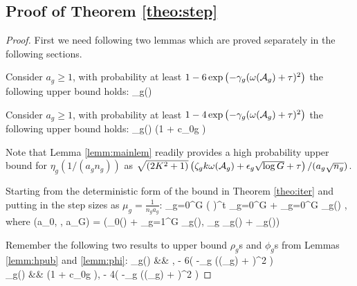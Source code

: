 \subsection{Proof of Theorem \ref{theo:step}}
\begin{proof}
	First we need following two lemmas which are proved separately in the following sections. 
	
	\begin{lemma}
		\label{lemm:hpub}
		Consider $a_g \geq 1$, with probability at least $1 - 6\exp\left( -\gamma_g (\omega({\cal A}_g) + \tau)^2  \right)$ the following upper bound holds:
		\be 
		\rho_g\left(\right) \leq {}  
		\ee
	\end{lemma}
	
	
	
	\begin{lemma}
		\label{lemm:phi}
		Consider $a_g \geq 1$, with probability at least $1 - 4\exp\left( -\gamma_g (\omega({\cal A}_g) + \tau)^2 \right)$ the following upper bound holds:
		\be 
		\phi_g\left(\right) \leq {}  \left(1 + c_{0g} \right)
		\ee
	\end{lemma}
	Note that Lemma \ref{lemm:mainlem} readily provides a high probability upper bound for $\eta_g(1/(a_g n_g))$ as $\sqrt{(2K^2 + 1)} \left(\zeta_g k \omega({\cal A}_g) + \epsilon_g \sqrt{\log G} +  \tau \right)/(a_g \sqrt{n_g})$.
	
	Starting from the deterministic form of the bound in Theorem \ref{theo:iter} and putting in the step sizes as $\mu_g = \frac{1}{n_g a_g}$:
	\be 
	\label{eq:deterOpt}
	\sum_{g=0}^{G}  \norm{\ddelta_g^{(t+1)}}{2}
	\leq ( \rho)^t \sum_{g=0}^{G}   +    \sum_{g=0}^{G}  \eta_g\left(\right) ,  
	\ee 
	where 
	\be
	\label{eq:rhoss}
	\rho(a_0, \cdots, a_G) = \max\left(\rho_0\left(\right) + \sum_{g=1}^{G}  \phi_g\left(\right), \max_{g \in [G]} \rho_g\left(\right) +  \phi_g\left(\right)\right)
	\ee
	
	
	Remember the following two results to upper bound $\rho_g$s  and $\phi_g$s from Lemmas \ref{lemm:hpub} and \ref{lemm:phi}: 
	\be 
	\nr 
	\rho_g\left(\right) &\leq&   , \quad {}  - 6\exp\left( -\gamma_g (\omega(\cA_g) + \tau)^2  \right)
	\\ \nr 
	\phi_g\left(\right) &\leq&   \left(1 + c_{0g} \right), \quad {}  - 4\exp\left( -\gamma_g (\omega(\cA_g) + \tau)^2  \right)
	\ee  
	

\end{proof}
